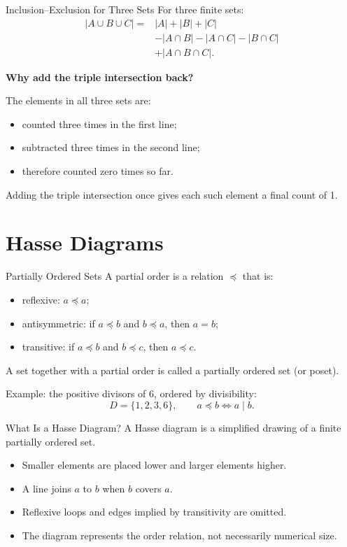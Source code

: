 \documentclass[aspectratio=169,11pt]{beamer}
\begin{document}
\begin{frame}{Inclusion--Exclusion for Three Sets}
For three finite sets:
\begin{align*}
|A\cup B\cup C|={}&|A|+|B|+|C|\\
&-|A\cap B|-|A\cap C|-|B\cap C|\\
&+|A\cap B\cap C|.
\end{align*}

\textbf{Why add the triple intersection back?}

The elements in all three sets are:
\begin{itemize}
  \item counted three times in the first line;
  \item subtracted three times in the second line;
  \item therefore counted zero times so far.
\end{itemize}
Adding the triple intersection once gives each such element a final count of 1.
\end{frame}

\section{Hasse Diagrams}

\begin{frame}{Partially Ordered Sets}
A \alert{partial order} is a relation \(\preceq\) that is:
\begin{itemize}
  \item reflexive: \(a\preceq a\);
  \item antisymmetric: if \(a\preceq b\) and \(b\preceq a\), then \(a=b\);
  \item transitive: if \(a\preceq b\) and \(b\preceq c\), then \(a\preceq c\).
\end{itemize}

A set together with a partial order is called a \alert{partially ordered set}
(or \alert{poset}).

Example: the positive divisors of 6, ordered by divisibility:
\[
  D=\{1,2,3,6\},\qquad a\preceq b\iff a\mid b.
\]
\end{frame}

\begin{frame}{What Is a Hasse Diagram?}
A Hasse diagram is a simplified drawing of a finite partially ordered set.

\begin{itemize}
  \item Smaller elements are placed lower and larger elements higher.
  \item A line joins \(a\) to \(b\) when \(b\) covers \(a\).
  \item Reflexive loops and edges implied by transitivity are omitted.
  \item The diagram represents the order relation, not necessarily numerical
        size.
\end{itemize}
\end{frame}
\end{document}
